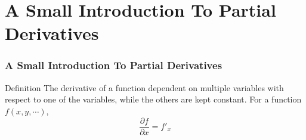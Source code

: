 \documentclass{beamer}
\begin{document}
\section{A Small Introduction To Partial Derivatives}
\begin{frame}
  \frametitle{A Small Introduction To Partial Derivatives}
\begin{block}{Definition}
The derivative of a function dependent on multiple variables with respect to one of the variables, while the others are kept constant. For a function $f(x,y,\cdots)$,
$$\frac{\partial f}{\partial x} = f'_x$$
  \end{block}
  \end{frame}
\end{document}
